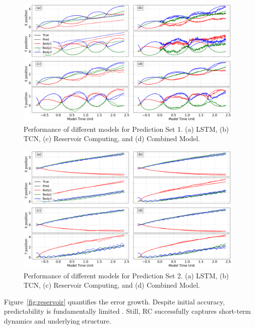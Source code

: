 \documentclass[%
 reprint,
 amsmath,amssymb,
 aps,
]{revtex4-2}
\begin{document}
\begin{figure}[htbp] %
    \centering
    \includegraphics[width=\linewidth]{plot_1_Final_Allplots_22x12_v2.png}
    \caption{Performance of different models for Prediction Set 1. (a) LSTM, (b) TCN, (c) Reservoir Computing, and (d) Combined Model.}
    \label{fig:prediction_set_1_results}
\end{figure}


\begin{figure}[htbp]
    \centering
    \includegraphics[width=\linewidth]{plot_3_Final_Allplots_22x12_v2.png}
    \caption{Performance of different models for Prediction Set 2. (a) LSTM, (b) TCN, (c) Reservoir Computing, and (d) Combined Model.}
    \label{fig:prediction_set_2_results}
\end{figure}

Figure~\ref{fig:reservoir} quantifies the error growth. Despite initial accuracy, predictability is fundamentally limited \cite{grebogi1983final}. Still, RC successfully captures short-term dynamics and underlying structure.
\end{document}
